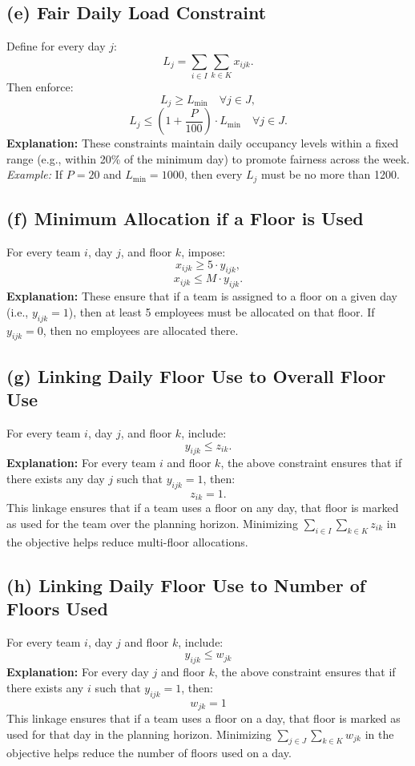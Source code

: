 \documentclass[11pt]{article}
\begin{document}
\subsection*{(e) Fair Daily Load Constraint}
Define for every day $j$:
\[
L_j = \sum_{i \in I} \sum_{k \in K} x_{ijk}.
\]
Then enforce:
\[
L_{j} \geq L_{\min} \quad \forall j \in J,
\]
\[
L_j \leq \left(1 + \frac{P}{100}\right) \cdot L_{\min} \quad \forall j \in J.
\]
\textbf{Explanation:} These constraints maintain daily occupancy levels within a fixed range (e.g., within 20\% of the minimum day) to promote fairness across the week. \emph{Example:} If \(P=20\) and \(L_{\min}=1000\), then every \(L_j\) must be no more than 1200.

\subsection*{(f) Minimum Allocation if a Floor is Used}
For every team $i$, day $j$, and floor $k$, impose:
\[
x_{ijk} \geq 5 \cdot y_{ijk},
\]
\[
x_{ijk} \leq M \cdot y_{ijk}.
\]
\textbf{Explanation:} These ensure that if a team is assigned to a floor on a given day (i.e., \(y_{ijk}=1\)), then at least 5 employees must be allocated on that floor. If \(y_{ijk}=0\), then no employees are allocated there.

\subsection*{(g) Linking Daily Floor Use to Overall Floor Use}
For every team $i$, day $j$, and floor $k$, include:
\[
y_{ijk} \leq z_{ik}.
\]
\textbf{Explanation:} For every team $i$ and floor $k$, the above constraint ensures that if there exists any day $j$ such that \(y_{ijk}=1\), then:
\[
z_{ik} = 1.
\]
This linkage ensures that if a team uses a floor on any day, that floor is marked as used for the team over the planning horizon. Minimizing \(\sum_{i \in I} \sum_{k \in K} z_{ik}\) in the objective helps reduce multi-floor allocations.

\subsection*{(h) Linking Daily Floor Use to Number of Floors Used}
For every team \(i\), day \(j\) and floor \(k\), include:
\[y_{ijk} \leq w_{jk}\]
\textbf{Explanation:} For every day \(j\) and floor \(k\), the above constraint ensures that if there exists any \(i\) such that \(y_{ijk}=1\), then:
\[w_{jk}=1\] 
This linkage ensures that if a team uses a floor on a day, that floor is marked as used for that day in the planning horizon. Minimizing \(\sum_{j \in J}\sum_{k \in K} w_{jk}\) in the objective helps reduce the number of floors used on a day.
\end{document}
